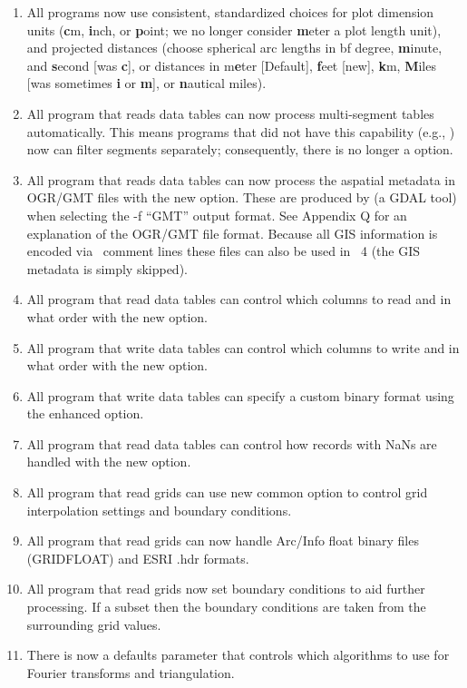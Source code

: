 \begin{enumerate}
	\item All programs now use consistent, standardized choices for plot dimension units (\textbf{c}m, \textbf{i}nch, or
	\textbf{p}oint;
		we no longer consider \textbf{m}eter a plot length unit), and projected distances (choose spherical arc lengths in {bf d}egree,
		\textbf{m}inute, and \textbf{s}econd [was \textbf{c}], or distances in m\textbf{e}ter [Default], \textbf{f}eet [new], 
		\textbf{k}m, \textbf{M}iles [was sometimes \textbf{i} or \textbf{m}], or \textbf{n}autical miles).
	\item All program that reads data tables can now process multi-segment tables automatically.  This means
		programs that did not have this capability (e.g., ) now can filter segments
		separately; consequently, there is no longer a  option.
	\item All program that reads data tables can now process the aspatial metadata in OGR/GMT files with the new  option.
		These are produced by  (a GDAL tool) when selecting the -f ``GMT'' output format.  See Appendix Q
		for an explanation of the OGR/GMT file format.  Because all GIS information is encoded via \GMT\ comment lines
		these files can also be used in \GMT\ 4 (the GIS metadata is simply skipped).
	\item All program that read data tables can control which columns to read and in what order with the new  option.
	\item All program that write data tables can control which columns to write and in what order with the new  option.
	\item All program that write data tables can specify a custom binary format using the enhanced  option.
	\item All program that read data tables can control how records with NaNs are handled with the new  option.
	\item All program that read grids can use new common option  to control grid interpolation settings and boundary conditions.
	\item All program that read grids can now handle Arc/Info float binary files (GRIDFLOAT) and ESRI .hdr formats.
	\item All program that read grids now set boundary conditions to aid further processing.  If a subset then the
		boundary conditions are taken from the surrounding grid values.
	\item There is now a defaults parameter that controls which algorithms to use for Fourier transforms and triangulation.

\end{enumerate}
